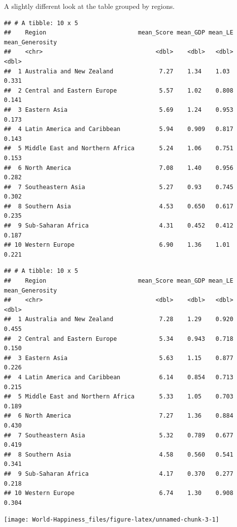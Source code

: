 \documentclass[
]{article}
\begin{document}
A slightly different look at the table grouped by regions.

\begin{verbatim}
## # A tibble: 10 x 5
##    Region                          mean_Score mean_GDP mean_LE mean_Generosity
##    <chr>                                <dbl>    <dbl>   <dbl>           <dbl>
##  1 Australia and New Zealand             7.27    1.34    1.03            0.331
##  2 Central and Eastern Europe            5.57    1.02    0.808           0.141
##  3 Eastern Asia                          5.69    1.24    0.953           0.173
##  4 Latin America and Caribbean           5.94    0.909   0.817           0.143
##  5 Middle East and Northern Africa       5.24    1.06    0.751           0.153
##  6 North America                         7.08    1.40    0.956           0.282
##  7 Southeastern Asia                     5.27    0.93    0.745           0.302
##  8 Southern Asia                         4.53    0.650   0.617           0.235
##  9 Sub-Saharan Africa                    4.31    0.452   0.412           0.187
## 10 Western Europe                        6.90    1.36    1.01            0.221
\end{verbatim}

\begin{verbatim}
## # A tibble: 10 x 5
##    Region                          mean_Score mean_GDP mean_LE mean_Generosity
##    <chr>                                <dbl>    <dbl>   <dbl>           <dbl>
##  1 Australia and New Zealand             7.28    1.29    0.920           0.455
##  2 Central and Eastern Europe            5.34    0.943   0.718           0.150
##  3 Eastern Asia                          5.63    1.15    0.877           0.226
##  4 Latin America and Caribbean           6.14    0.854   0.713           0.215
##  5 Middle East and Northern Africa       5.33    1.05    0.703           0.189
##  6 North America                         7.27    1.36    0.884           0.430
##  7 Southeastern Asia                     5.32    0.789   0.677           0.419
##  8 Southern Asia                         4.58    0.560   0.541           0.341
##  9 Sub-Saharan Africa                    4.17    0.370   0.277           0.218
## 10 Western Europe                        6.74    1.30    0.908           0.304
\end{verbatim}

\begin{center}\texttt{[image: World-Happiness\_files/figure-latex/unnamed-chunk-3-1]} \end{center}
\end{document}
